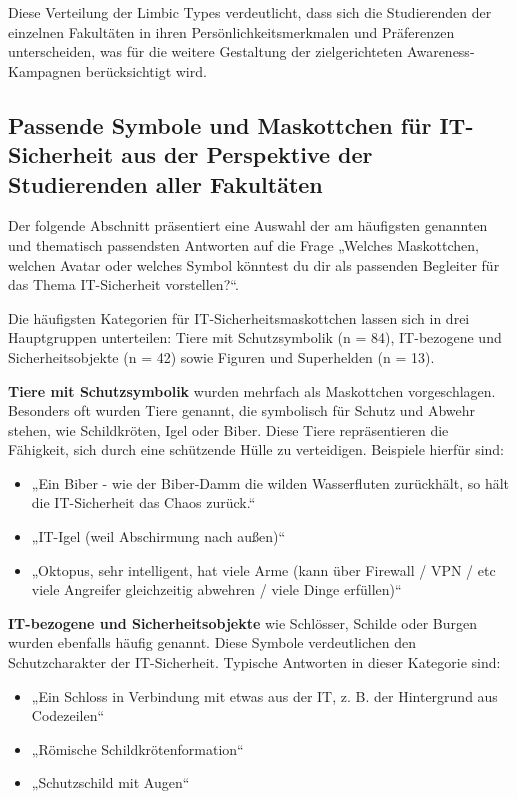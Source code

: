 \documentclass[german,report]{i1thesis}
\begin{document}
Diese Verteilung der Limbic Types verdeutlicht, dass sich die Studierenden der einzelnen Fakultäten in ihren Persönlichkeitsmerkmalen und Präferenzen unterscheiden, was für die weitere Gestaltung der zielgerichteten Awareness-Kampagnen berücksichtigt wird.

\subsection{Passende Symbole und Maskottchen für IT-Sicherheit aus der Perspektive der Studierenden aller Fakultäten}

Der folgende Abschnitt präsentiert eine Auswahl der am häufigsten genannten und thematisch passendsten Antworten auf die Frage „Welches Maskottchen, welchen Avatar oder welches Symbol könntest du dir als passenden Begleiter für das Thema IT-Sicherheit vorstellen?“.

Die häufigsten Kategorien für IT-Sicherheitsmaskottchen lassen sich in drei Hauptgruppen unterteilen: Tiere mit Schutzsymbolik (n = 84), IT-bezogene und Sicherheitsobjekte (n = 42) sowie Figuren und Superhelden (n = 13).

\textbf{Tiere mit Schutzsymbolik} wurden mehrfach als Maskottchen vorgeschlagen. Besonders oft wurden Tiere genannt, die symbolisch für Schutz und Abwehr stehen, wie Schildkröten, Igel oder Biber. Diese Tiere repräsentieren die Fähigkeit, sich durch eine schützende Hülle zu verteidigen. Beispiele hierfür sind:
\begin{itemize}
    \item „Ein Biber - wie der Biber-Damm die wilden Wasserfluten zurückhält, so hält die IT-Sicherheit das Chaos zurück.“
    \item „IT-Igel (weil Abschirmung nach außen)“
    \item „Oktopus, sehr intelligent, hat viele Arme (kann über Firewall / VPN / etc viele Angreifer gleichzeitig abwehren / viele Dinge erfüllen)“
\end{itemize}

\textbf{IT-bezogene und Sicherheitsobjekte} wie Schlösser, Schilde oder Burgen wurden ebenfalls häufig genannt. Diese Symbole verdeutlichen den Schutzcharakter der IT-Sicherheit. Typische Antworten in dieser Kategorie sind:
\begin{itemize}
    \item „Ein Schloss in Verbindung mit etwas aus der IT, z. B. der Hintergrund aus Codezeilen“
    \item „Römische Schildkrötenformation“
    \item „Schutzschild mit Augen“
\end{itemize}
\end{document}

